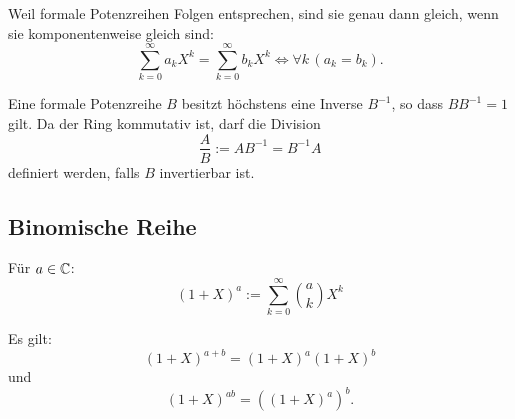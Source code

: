  Weil formale Potenzreihen
Folgen entsprechen, sind sie genau dann gleich, wenn sie
komponentenweise gleich sind:
\begin{equation}
\sum_{k=0}^\infty a_k X^k = \sum_{k=0}^\infty b_k X^k
\iff \forall k\,(a_k=b_k).
\end{equation}

Eine formale Potenzreihe $B$ besitzt höchstens eine Inverse $B^{-1}$,
so dass $BB^{-1}=1$ gilt. Da der Ring kommutativ ist, darf die
Division
\begin{equation}
\frac{A}{B} := AB^{-1} = B^{-1}A
\end{equation}
definiert werden, falls $B$ invertierbar ist.

\subsection{Binomische Reihe}
\begin{definition}
Für $a\in\mathbb C$:
\begin{equation}
(1+X)^a := \sum_{k=0}^\infty \binom{a}{k} X^k
\end{equation}
\end{definition}
\noindent
Es gilt:
\begin{equation}
(1+X)^{a+b} = (1+X)^a (1+X)^b 
\end{equation}
und
\begin{equation}
(1+X)^{ab} = ((1+X)^a)^b.
\end{equation}
